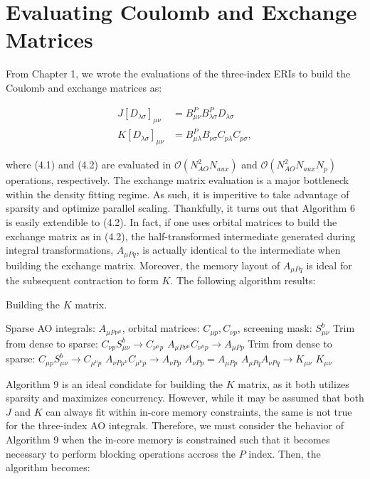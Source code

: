 \chapter{Evaluating Coulomb and Exchange Matrices}

From Chapter 1, we wrote the evaluations of the three-index ERIs to build the Coulomb and exchange matrices as:

\begin{align}
J[D_{\lambda \sigma}]_{\mu \nu} &= B_{\mu \nu}^P B_{\lambda \sigma}^PD_{\lambda \sigma} \\
K[D_{\lambda \sigma}]_{\mu \nu} &= B_{\mu \lambda}^P B_{\nu \sigma}C_{p\lambda}C_{p\sigma},
\end{align}

\noindent where (4.1) and (4.2) are evaluated in $\mathcal{O}(N_{AO}^2N_{aux})$ and $\mathcal{O}(N_{AO}^2N_{aux}N_p)$ operations, respectively.
The exchange matrix evaluation is a major bottleneck within the density fitting regime. As such, it is imperitive to take advantage of sparsity
and optimize parallel scaling. Thankfully, it turns out that Algorithm 6 is easily 
extendible to (4.2). In fact, if one uses orbital matrices to build the exchange matrix as in (4.2), the half-transformed 
intermediate generated during integral transformations, $A_{\mu Pq}$, is actually identical to the intermediate when building the exchange matrix. 
Moreover, the memory layout of $A_{\mu Pq}$ is ideal for the subsequent contraction to form $K$. The following algorithm results:

\begin{algorithm}[H]
\caption{Building the $K$ matrix.}
\begin{algorithmic}
\REQUIRE Sparse AO integrals: $A_{\mu P \nu^\mu}$, orbital matrices: $C_{\mu p}, C_{\nu p}$, screening mask: $S_{\mu \nu}^b$
    \STATE Trim from dense to sparse: $C_{\nu p}S_{\mu \nu}^b \rightarrow C_{\nu^{\mu} p}$
    \STATE $A_{\mu P \nu^{\mu}} C_{\nu^{\mu} p} \rightarrow A_{\mu Pp}$
        \STATE Trim from dense to sparse: $C_{\mu p}S_{\mu \nu}^b \rightarrow C_{\mu^{\nu} p}$
        \STATE $A_{\nu P \mu^{\nu}} C_{\mu^{\nu} p} \rightarrow A_{\nu P p}$
    \ELSE
        \STATE $A_{\nu P p} = A_{\mu P p}$ 
    \ENDIF
\ENDFOR
\STATE $A_{\mu P q} A_{\nu P q} \rightarrow K_{\mu \nu} $
\RETURN $K_{\mu \nu}$
\end{algorithmic}
\end{algorithm}

Algorithm 9 is an ideal condidate for building the $K$ matrix, as it both utilizes sparsity and maximizes concurrency.
However, while it may be assumed that both $J$ and $K$ can always fit within in-core memory constraints, the same is not true 
for the three-index AO integrals.  Therefore, we must consider the behavior of Algorithm 9 when the 
in-core memory is constrained such that it becomes necessary to perform blocking operations accross the $P$ index. Then, the algorithm
becomes: 

